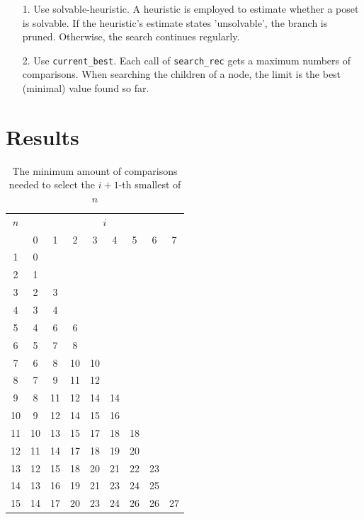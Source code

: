 \documentclass[10pt,journal,compsoc]{IEEEtran}
\begin{document}
\begin{enumerate}
  \item[1.]
    Use solvable-heuristic. A heuristic is employed to estimate whether a poset is solvable. If the heuristic's estimate states 'unsolvable', the branch is pruned.
    Otherwise, the search continues regularly.
  \item[2.]
    Use \texttt{current\_best}. Each call of \texttt{search\_rec} gets a maximum numbers of comparisons.
    When searching the children of a node, the limit is the best (minimal) value found so far.
\end{enumerate}

\section{Results}

\begin{table}
  \centering
  \begin{tabular}{c|cccccccc}
    $n$ & \multicolumn{8}{c}{$i$}                                    \\
        & 0                       & 1  & 2  & 3  & 4  & 5  & 6  & 7  \\ \hline
    1   & 0                                                          \\
    2   & 1                                                          \\
    3   & 2                       & 3                                \\
    4   & 3                       & 4                                \\
    5   & 4                       & 6  & 6                           \\
    6   & 5                       & 7  & 8                           \\
    7   & 6                       & 8  & 10 & 10                     \\
    8   & 7                       & 9  & 11 & 12                     \\
    9   & 8                       & 11 & 12 & 14 & 14                \\
    10  & 9                       & 12 & 14 & 15 & 16                \\
    11  & 10                      & 13 & 15 & 17 & 18 & 18           \\
    12  & 11                      & 14 & 17 & 18 & 19 & 20           \\
    13  & 12                      & 15 & 18 & 20 & 21 & 22 & 23      \\
    14  & 13                      & 16 & 19 & 21 & 23 & 24 & 25      \\
    15  & 14                      & 17 & 20 & 23 & 24 & 26 & 26 & 27 \\
  \end{tabular}
  \caption{The minimum amount of comparisons needed to select the $i+1$-th smallest of $n$}
  \label{table:num-comparisons}
\end{table}
\end{document}
